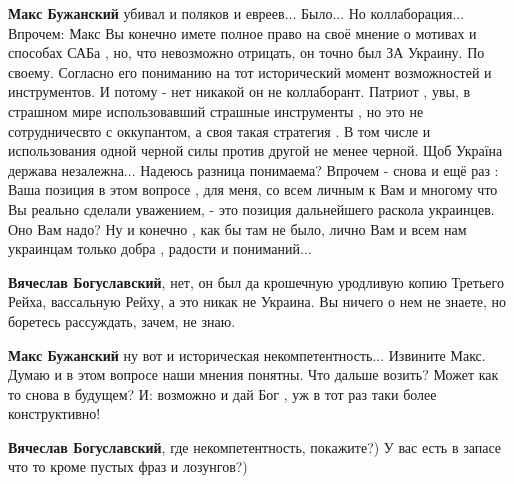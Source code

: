 \begin{itemize}
\begin{itemize}
\textbf{Макс Бужанский} убивал и поляков и евреев... Было... Но коллаборация...
Впрочем: Макс Вы конечно имете полное право на своё мнение о мотивах и способах
САБа , но, что невозможно отрицать, он точно был ЗА Украину. По своему.
Согласно его пониманию на тот исторический момент возможностей и инструментов.
И потому - нет никакой он не коллаборант. Патриот , увы, в страшном мире
использовавший страшные инструменты , но это не сотрудничесвто с оккупантом, а
своя такая стратегия . В том числе и использования одной черной силы против
другой не менее черной. Щоб Україна держава незалежна... Надеюсь разница
понимаема? \Smiley[1.0][yellow] Впрочем - снова и ещё раз : Ваша позиция в этом вопросе , для
меня, со всем личным к Вам и многому что Вы реально сделали уважением, - это
позиция дальнейшего раскола украинцев. Оно Вам надо? \Smiley[1.0][yellow] Ну и конечно , как бы
там не было, лично Вам и всем нам украинцам только добра , радости и
пониманий... \Smiley[1.0][yellow]

 
\textbf{Вячеслав Богуславский}, нет, он был да крошечную уродливую копию Третьего Рейха, вассальную Рейху, а это никак не Украина.
Вы ничего о нем не знаете, но боретесь рассуждать, зачем, не знаю.

 
\textbf{Макс Бужанский} ну вот и историческая некомпетентность... \Smiley[1.0][yellow] Извините Макс. Думаю и в этом вопросе наши мнения понятны. \Smiley[1.0][yellow] Что дальше возить? \Smiley[1.0][yellow] Может как то снова в будущем? \Smiley[1.0][yellow] И: возможно и дай Бог , уж в тот раз таки более конструктивно! \Smiley[1.0][yellow]

 
\textbf{Вячеслав Богуславский}, где некомпетентность, покажите?) У вас есть в запасе что то кроме пустых фраз и лозунгов?)


\end{itemize}
\end{itemize}

